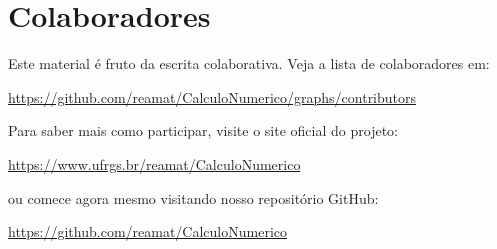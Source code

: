 
\chapter*{Colaboradores}

Este material é fruto da escrita colaborativa. Veja a lista de colaboradores em:
\begin{center}
  \url{https://github.com/reamat/CalculoNumerico/graphs/contributors}
\end{center}

Para saber mais como participar, visite o site oficial do projeto:
\begin{center}
  \url{https://www.ufrgs.br/reamat/CalculoNumerico}
\end{center}
ou comece agora mesmo visitando nosso repositório GitHub:
\begin{center}
  \url{https://github.com/reamat/CalculoNumerico}
\end{center}




